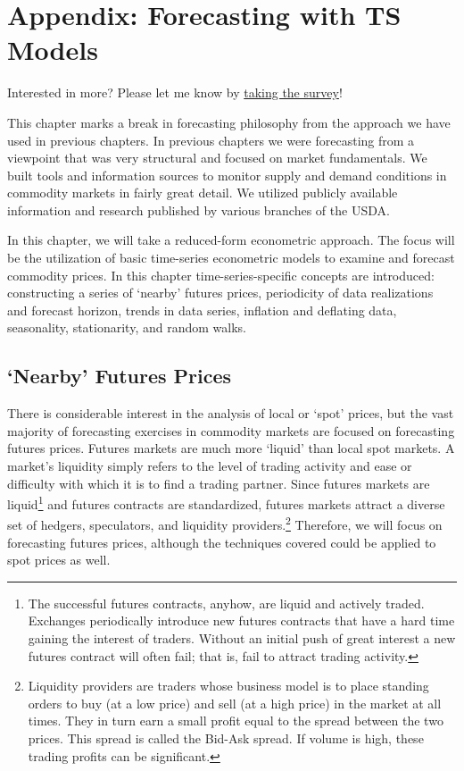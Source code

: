 \documentclass[
  letterpaper,
  DIV=11,
  numbers=noendperiod]{scrreprt}
\begin{document}

\hypertarget{appendix-forecasting-with-ts-models}{%
\chapter{Appendix: Forecasting with TS
Models}\label{appendix-forecasting-with-ts-models}}

{Interested in more? Please let me know by}
\href{https://forms.gle/Q3VByCQZHjfQSy9D7}{taking the survey}!

This chapter marks a break in forecasting philosophy from the approach
we have used in previous chapters. In previous chapters we were
forecasting from a viewpoint that was very structural and focused on
market fundamentals. We built tools and information sources to monitor
supply and demand conditions in commodity markets in fairly great
detail. We utilized publicly available information and research
published by various branches of the USDA.

In this chapter, we will take a reduced-form econometric approach. The
focus will be the utilization of basic time-series econometric models to
examine and forecast commodity prices. In this chapter
time-series-specific concepts are introduced: constructing a series of
`nearby' futures prices, periodicity of data realizations and forecast
horizon, trends in data series, inflation and deflating data,
seasonality, stationarity, and random walks.

\hypertarget{nearby-futures-prices}{%
\section{`Nearby' Futures Prices}\label{nearby-futures-prices}}

There is considerable interest in the analysis of local or `spot'
prices, but the vast majority of forecasting exercises in commodity
markets are focused on forecasting futures prices. Futures markets are
much more `liquid' than local spot markets. A market's liquidity simply
refers to the level of trading activity and ease or difficulty with
which it is to find a trading partner. Since futures markets are
liquid\footnote{The successful futures contracts, anyhow, are liquid and
  actively traded. Exchanges periodically introduce new futures
  contracts that have a hard time gaining the interest of traders.
  Without an initial push of great interest a new futures contract will
  often fail; that is, fail to attract trading activity.} and futures
contracts are standardized, futures markets attract a diverse set of
hedgers, speculators, and liquidity providers.\footnote{Liquidity
  providers are traders whose business model is to place standing orders
  to buy (at a low price) and sell (at a high price) in the market at
  all times. They in turn earn a small profit equal to the spread
  between the two prices. This spread is called the Bid-Ask spread. If
  volume is high, these trading profits can be significant.} Therefore,
we will focus on forecasting futures prices, although the techniques
covered could be applied to spot prices as well.
\end{document}
